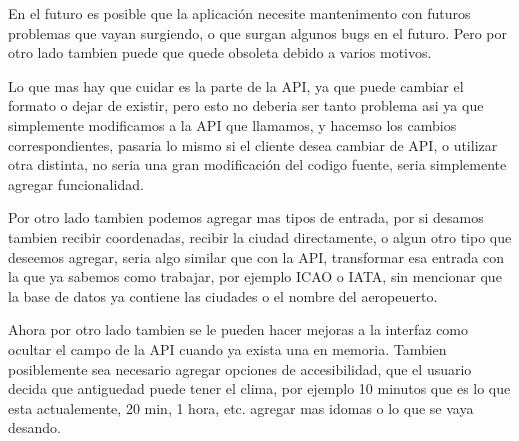 En el futuro es posible que la aplicación necesite mantenimento con futuros problemas que vayan surgiendo, o que surgan algunos bugs en el futuro. Pero por otro lado tambien puede
que quede obsoleta debido a varios motivos.

Lo que mas hay que cuidar es la parte de la API, ya que puede cambiar el formato o dejar de existir, pero esto no deberia ser tanto problema
asi ya que simplemente modificamos a la API que llamamos, y hacemso los cambios correspondientes, pasaria lo mismo si el cliente desea cambiar
de API, o utilizar otra distinta, no seria una gran modificación del codigo fuente, seria simplemente agregar funcionalidad. 

Por otro lado tambien podemos agregar mas tipos de entrada, por si desamos tambien recibir coordenadas, recibir la ciudad directamente, 
o algun otro tipo que deseemos agregar, seria algo similar que con la API, transformar esa entrada con la que ya sabemos como trabajar,
por ejemplo ICAO o IATA, sin mencionar que la base de datos ya contiene las ciudades o el nombre del aeropeuerto.

Ahora por otro lado tambien se le pueden hacer mejoras a la interfaz como ocultar el campo de la API cuando ya exista una en 
memoria. Tambien posiblemente sea necesario agregar opciones de accesibilidad, que el usuario decida que antiguedad puede tener
el clima, por ejemplo 10 minutos que es lo que esta actualemente, 20 min, 1 hora, etc.
agregar mas idomas o lo que se vaya desando.
